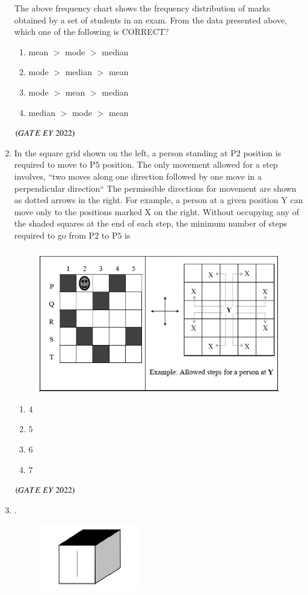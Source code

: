 \documentclass[journal]{IEEEtran}
\numberwithin{equation}{enumi}
\numberwithin{figure}{enumi}
\begin{document}
\begin{enumerate}
   The above frequency chart shows the frequency distribution of marks obtained
by a set of students in an exam.
From the data presented above, which one of the following is CORRECT?
    \begin{enumerate}
        \item  mean $>$ mode $>$ median
        \item  mode $>$ median $>$ mean
        \item  mode $>$ mean $>$ median
        \item  median $>$ mode $>$ mean
    \end{enumerate}
    \hfill{$\brak{ GATE\ EY\ 2022}$}
    \bigskip
 \item In the square grid shown on the left, a person standing at P$2$ position is required
to move to P$5$ position.
The only movement allowed for a step involves, ``two moves along one direction followed by one move in a perpendicular direction`` The permissible directions for movement are shown as dotted arrows in the right.
For example, a person at a given position Y can move only to the positions
marked X on the right.
Without occupying any of the shaded squares at the end of each step, the
minimum number of steps required to go from P$2$ to P$5$ is
\begin{figure}[H]
    \centering
\includegraphics[width=0.5\columnwidth]{figs/3.png}
    \caption{}
    \label{fig:3}
   \end{figure}
    \begin{enumerate}
        \item  $4$
        \item  $5$
        \item  $6$
        \item  $7$
    \end{enumerate}
    \hfill{$\brak{ GATE\ EY\ 2022}$}
    \bigskip
 \item .
 \begin{figure}[H]
    \centering
\includegraphics[width=0.5\columnwidth]{figs/4.png}

\end{figure}
\end{enumerate}
\end{document}
